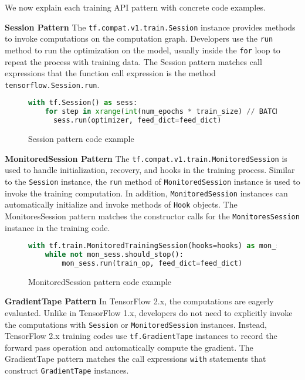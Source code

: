 We now explain each training API pattern with concrete code examples.

\textbf{Session Pattern} 
The {\tt tf.compat.v1.train.Session} instance provides methods to
invoke computations on the computation graph.
Developers use the {\tt run} method to run the optimization on the model,
usually inside the {\tt for} loop to repeat the process with training data.
The Session pattern matches call expressions that the function
call expression is the method {\tt tensorflow.Session.run}.

\begin{figure}[!ht]
\begin{lstlisting}[language=Python]
with tf.Session() as sess:
    for step in xrange(int(num_epochs * train_size) // BATCH_SIZE):
      sess.run(optimizer, feed_dict=feed_dict)
\end{lstlisting}
\caption{Session pattern code example}
\end{figure}

\textbf{MonitoredSession Pattern}
The {\tt tf.compat.v1.train.MonitoredSession} is used to handle initialization,
recovery, and hooks in the training process\cite{monitoredsession}.
Similar to the {\tt Session} instance, the {\tt run} method of
{\tt MonitoredSession} instance is used to invoke the training computation.
In addition, {\tt MonitoredSession} instances can automatically
initialize and invoke methods of {\tt Hook} objects.
The MonitoresSession pattern matches the constructor calls for the
{\tt MonitoresSession} instance in the training code.

\begin{figure}[!ht]
  \begin{lstlisting}[language=Python]
with tf.train.MonitoredTrainingSession(hooks=hooks) as mon_sess:
    while not mon_sess.should_stop():
        mon_sess.run(train_op, feed_dict=feed_dict)
  \end{lstlisting}
  \caption{MonitoredSession pattern code example}
\end{figure}


\textbf{GradientTape Pattern}
In TensorFlow 2.x, the computations are eagerly evaluated.
Unlike in TensorFlow 1.x, developers do not need to explicitly invoke the computations
with {\tt Session} or {\tt MonitoredSession} instances.
Instead, TensorFlow 2.x training codes use {\tt tf.GradientTape} instances
to record the forward pass operation and automatically compute the gradient.
The GradientTape pattern matches the call expressions {\tt with} statements
that construct {\tt GradientTape} instances.

